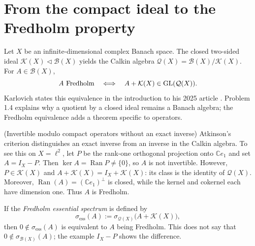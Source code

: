 \section{From the compact ideal to the Fredholm property}

Let $X$ be an infinite-dimensional complex Banach space. The closed two-sided ideal
$\mathcal K(X)\triangleleft\mathcal B(X)$ yields the Calkin algebra
$\mathcal Q(X)=\mathcal B(X)/\mathcal K(X)$. For $A\in\mathcal B(X)$,
\[
 A\text{ Fredholm}
 \quad\Longleftrightarrow\quad
 A+\mathcal K(X)\in\operatorname{GL}(\mathcal Q(X)).
\]
Karlovich states this equivalence in the introduction to his 2025 article
\cite[p.~2]{Karlovich2025}. Problem 1.4 explains why a quotient by a closed ideal
remains a Banach algebra; the Fredholm equivalence adds a theorem specific to operators.

\begin{cthejemplo}{(Invertible modulo compact operators without an exact inverse)}
Atkinson's criterion distinguishes an exact inverse from an inverse in the Calkin algebra.
To see this on $X=\ell^2$, let $P$ be the rank-one orthogonal projection onto
$\mathbb Ce_1$ and set $A=I_X-P$. Then
$\ker A=\operatorname{Ran}P\ne\{0\}$, so $A$ is not invertible. However,
$P\in\mathcal K(X)$ and $A+\mathcal K(X)=I_X+\mathcal K(X)$: its class is the
identity of $\mathcal Q(X)$. Moreover,
$\operatorname{Ran}(A)=(\mathbb Ce_1)^\perp$ is closed, while the kernel and
cokernel each have dimension one. Thus $A$ is Fredholm.
\end{cthejemplo}

If the \emph{Fredholm essential spectrum} is defined by
\[
 \sigma_{\mathrm{ess}}(A)
 :=\sigma_{\mathcal Q(X)}\bigl(A+\mathcal K(X)\bigr),
\]
then $0\notin\sigma_{\mathrm{ess}}(A)$ is equivalent to $A$ being Fredholm.
This does not say that $0\notin\sigma_{\mathcal B(X)}(A)$; the example $I_X-P$
shows the difference.

\begin{center}
\end{center}


